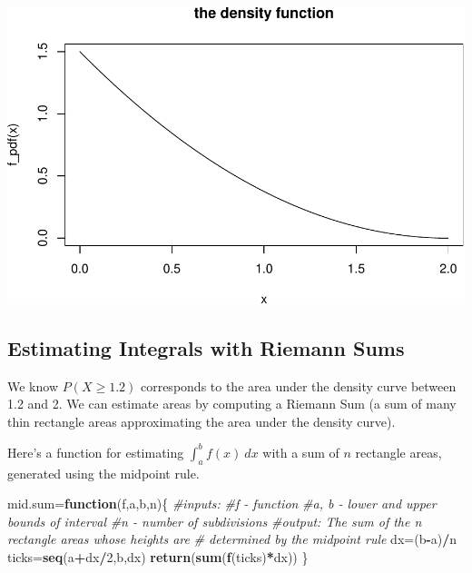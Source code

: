 \documentclass[
]{book}
\newenvironment{Shaded}{\begin{snugshade}}{\end{snugshade}}
\newcommand{\CommentTok}[1]{\textcolor[rgb]{0.56,0.35,0.01}{\textit{#1}}}
\newcommand{\ControlFlowTok}[1]{\textcolor[rgb]{0.13,0.29,0.53}{\textbf{#1}}}
\newcommand{\DecValTok}[1]{\textcolor[rgb]{0.00,0.00,0.81}{#1}}
\newcommand{\FunctionTok}[1]{\textcolor[rgb]{0.13,0.29,0.53}{\textbf{#1}}}
\newcommand{\NormalTok}[1]{#1}
\newcommand{\OtherTok}[1]{\textcolor[rgb]{0.56,0.35,0.01}{#1}}
\newcommand{\SpecialCharTok}[1]{\textcolor[rgb]{0.81,0.36,0.00}{\textbf{#1}}}
\theoremstyle{definition}
\theoremstyle{definition}
\theoremstyle{definition}
\theoremstyle{definition}
\theoremstyle{remark}
\begin{document}
\includegraphics{math340-notes_files/figure-latex/plot pdf-1.pdf}

\subsection*{Estimating Integrals with Riemann Sums}\label{estimating-integrals-with-riemann-sums}

We know \(P(X \geq 1.2)\) corresponds to the area under the density curve between 1.2 and 2. We can estimate areas by computing a Riemann Sum (a sum of many thin rectangle areas approximating the area under the density curve).

Here's a function for estimating \(\int_a^b f(x)~dx\) with a sum of \(n\) rectangle areas, generated using the midpoint rule.

\begin{Shaded}
\begin{Highlighting}[]
\NormalTok{mid.sum}\OtherTok{=}\ControlFlowTok{function}\NormalTok{(f,a,b,n)\{}
  \CommentTok{\#inputs:}
      \CommentTok{\#f {-} function}
      \CommentTok{\#a, b {-} lower and upper bounds of interval}
      \CommentTok{\#n {-} number of subdivisions}
  \CommentTok{\#output: The sum of the n rectangle areas whose heights are}
  \CommentTok{\# determined by the midpoint rule}
\NormalTok{  dx}\OtherTok{=}\NormalTok{(b}\SpecialCharTok{{-}}\NormalTok{a)}\SpecialCharTok{/}\NormalTok{n}
\NormalTok{  ticks}\OtherTok{=}\FunctionTok{seq}\NormalTok{(a}\SpecialCharTok{+}\NormalTok{dx}\SpecialCharTok{/}\DecValTok{2}\NormalTok{,b,dx)}
  \FunctionTok{return}\NormalTok{(}\FunctionTok{sum}\NormalTok{(}\FunctionTok{f}\NormalTok{(ticks)}\SpecialCharTok{*}\NormalTok{dx))}
\NormalTok{\}}
\end{Highlighting}
\end{Shaded}
\end{document}
